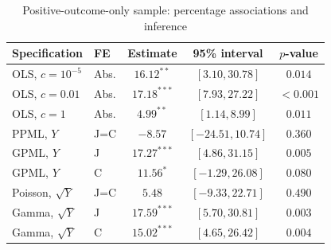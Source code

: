 \begin{table}[!htbp]
\centering
\begin{singlespace}
\normalsize
\caption{Positive-outcome-only sample: percentage associations and inference}
\label{table:application-positive-only}
\setlength{\tabcolsep}{4pt}
\begin{tabular*}{\textwidth}{@{\extracolsep{\fill}}llccc@{}}
\toprule
Specification & FE & Estimate & 95\% interval & \(p\)-value \\
\midrule
OLS, \(c=10^{-5}\) & Abs. & \(16.12^{**}\) & \([3.10,30.78]\) & \(0.014\) \\
OLS, \(c=0.01\) & Abs. & \(17.18^{***}\) & \([7.93,27.22]\) & \(<0.001\) \\
OLS, \(c=1\) & Abs. & \(4.99^{**}\) & \([1.14,8.99]\) & \(0.011\) \\
PPML, \(Y\) & J=C & \(-8.57\) & \([-24.51,10.74]\) & \(0.360\) \\
GPML, \(Y\) & J & \(17.27^{***}\) & \([4.86,31.15]\) & \(0.005\) \\
GPML, \(Y\) & C & \(11.56^{*}\) & \([-1.29,26.08]\) & \(0.080\) \\
Poisson, \(\sqrt{Y}\) & J=C & \(5.48\) & \([-9.33,22.71]\) & \(0.490\) \\
Gamma, \(\sqrt{Y}\) & J & \(17.59^{***}\) & \([5.70,30.81]\) & \(0.003\) \\
Gamma, \(\sqrt{Y}\) & C & \(15.02^{***}\) & \([4.65,26.42]\) & \(0.004\) \\
\bottomrule
\end{tabular*}
\par\smallskip
\begin{minipage}{\textwidth}
\end{minipage}
\end{singlespace}
\end{table}
